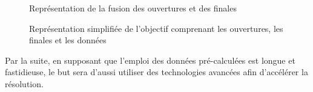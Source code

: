 	\begin{figure}[H]
		\begin{center}
				
		\end{center}
		\caption{Représentation de la fusion des ouvertures et des finales}
		\label{fig:ouvertures_finales}
		\endminipage\hfill
		\begin{center}
				
		\end{center}
		\caption{Représentation simplifiée de l'objectif comprenant les ouvertures, les finales et les données}\label{fig:objectif}
		\endminipage\hfill
	\end{figure}
	
	Par la suite, en supposant que l'emploi des données pré-calculées est longue et fastidieuse, le but sera d'aussi utiliser des technologies avancées afin d'accélérer la résolution.